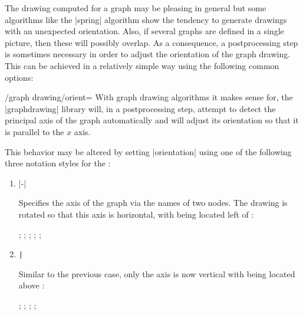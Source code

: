 \label{subsection-library-graphdrawing-standard-orientation}

The drawing computed for a graph may be pleasing in general but some
algorithms like the |spring| algorithm show the tendency to generate
drawings with an unexpected orientation. Also, if several graphs are 
defined in a single picture, then these will possibly overlap.
As a consequence, a postprocessing step is sometimes necessary in order
to adjust the orientation of the graph drawing. This can be achieved in
a relatively simple way using the following common options:


\begin{key}{/graph drawing/orient=}
  With graph drawing algorithms it makes sense for, the |graphdrawing|
  library will, in a postprocessing step, attempt to detect the 
  principal axis of the graph automatically and will adjust its 
  orientation so that it is parallel to the $x$ axis.

  This behavior may be altered by setting |orientation| using one of
  the following three notation styles for the :
  \begin{enumerate}
  \item  {}|-| 

    Specifies the axis of the graph via the names of two nodes. The
    drawing is rotated so that this axis is horizontal,
    with  being located left of :
\begin{codeexample}[]
\tikz {};
\tikz {};
\tikz {};
\tikz {};
\tikz {};
\end{codeexample}
  
  \item {}\verb!|!
    
    Similar to the previous case, only the axis is now vertical with 
     being located above :
\begin{codeexample}[]
\tikz {};
\tikz {};
\tikz {};
\tikz {};
\end{codeexample}
  

\end{enumerate}
\end{key}
